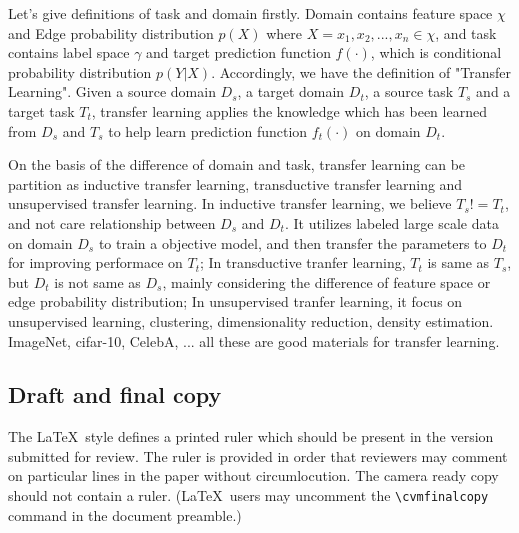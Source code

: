 \documentclass[10pt,twocolumn,letterpaper]{article}
\begin{document}
    Let's give definitions of task and domain firstly. Domain contains feature space $\chi$ and Edge probability distribution $p(X)$ where $X = {x_1, x_2, ..., x_n}\in{\chi}$, and task contains label space $\gamma$ and target prediction function $f(\cdot)$, which is conditional probability distribution $p(Y|X)$. Accordingly, we have the definition of "Transfer Learning". Given a source domain $D_s$, a target domain $D_t$, a source task $T_s$ and a target task $T_t$, transfer learning applies the knowledge which has been learned from $D_s$ and $T_s$ to help learn prediction function ${f_t}(\cdot)$ on domain $D_t$.

    On the basis of the difference of domain and task, transfer learning can be partition as inductive transfer learning, transductive transfer learning and unsupervised transfer learning. In inductive transfer learning, we believe $T_s != T_t$, and not care relationship between $D_s$ and $D_t$. It utilizes labeled large scale data on domain $D_s$ to train a objective model, and then transfer the parameters to $D_t$ for improving performace on $T_t$; In transductive tranfer learning, $T_t$ is same as $T_s$, but $D_t$ is not same as $D_s$, mainly considering the difference of feature space or edge probability distribution; In unsupervised tranfer learning, it focus on unsupervised learning, \eg clustering, dimensionality reduction, density estimation. ImageNet, cifar-10, CelebA, ... all these are good materials for transfer learning.



\subsection{Draft and final copy}
The \LaTeX\ style defines a printed ruler which should be present in the
version submitted for review.  The ruler is provided in order that
reviewers may comment on particular lines in the paper without
circumlocution. The camera ready copy should not contain a ruler.
(\LaTeX\ users may uncomment the \verb'\cvmfinalcopy' command in the document preamble.)
\end{document}
